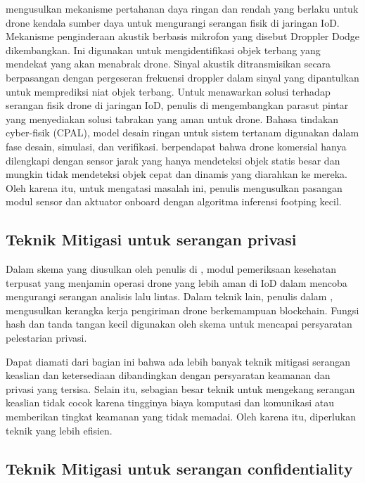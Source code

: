 \citet{garg2020acoustic} mengusulkan mekanisme pertahanan daya ringan dan rendah yang berlaku untuk drone kendala sumber daya untuk mengurangi serangan fisik di jaringan IoD. Mekanisme penginderaan akustik berbasis mikrofon yang disebut Droppler Dodge dikembangkan. Ini digunakan untuk mengidentifikasi objek terbang yang mendekat yang akan menabrak drone. Sinyal akustik ditransmisikan secara berpasangan dengan pergeseran frekuensi droppler dalam sinyal yang dipantulkan untuk memprediksi niat objek terbang. Untuk menawarkan solusi terhadap serangan fisik drone di jaringan IoD, penulis di \citep{ciarletta2016development} mengembangkan parasut pintar yang menyediakan solusi tabrakan yang aman untuk drone. Bahasa tindakan cyber-fisik (CPAL), model desain ringan untuk sistem tertanam digunakan dalam fase desain, simulasi, dan verifikasi. \citet{garg2020enabling} berpendapat bahwa drone komersial hanya dilengkapi dengan sensor jarak yang hanya mendeteksi objek statis besar dan mungkin tidak mendeteksi objek cepat dan dinamis yang diarahkan ke mereka. Oleh karena itu, untuk mengatasi masalah ini, penulis mengusulkan pasangan modul sensor dan aktuator onboard dengan algoritma inferensi footping kecil.

\subsection{Teknik Mitigasi untuk serangan privasi}
\label{subsec:mitigasiprivasi}

Dalam skema yang diusulkan oleh penulis di \citep{pigatto2015sphere}, modul pemeriksaan kesehatan terpusat yang menjamin operasi drone yang lebih aman di IoD dalam mencoba mengurangi serangan analisis lalu lintas. Dalam teknik lain, penulis dalam \citep{ferrag2019deliverycoin}, mengusulkan kerangka kerja pengiriman drone berkemampuan blockchain. Fungsi hash dan tanda tangan kecil digunakan oleh skema untuk mencapai persyaratan pelestarian privasi.



Dapat diamati dari bagian ini bahwa ada lebih banyak teknik mitigasi serangan keaslian dan ketersediaan dibandingkan dengan persyaratan keamanan dan privasi yang tersisa. Selain itu, sebagian besar teknik untuk mengekang serangan keaslian tidak cocok karena tingginya biaya komputasi dan komunikasi atau memberikan tingkat keamanan yang tidak memadai. Oleh karena itu, diperlukan teknik yang lebih efisien.

\subsection{Teknik Mitigasi untuk serangan confidentiality}
\label{subsec:mitigasiconfidentiality}


